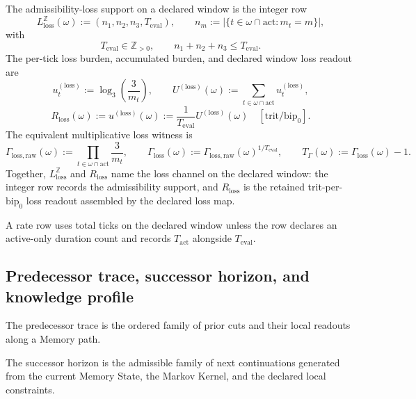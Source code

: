 \begin{definition}
\label{def:loss-channel}
The admissibility-loss support on a declared window is the integer row
\[
L_{\mathrm{loss}}^{\mathbb Z}(\omega):=(n_1,n_2,n_3,T_{\mathrm{eval}}),
\qquad
n_m:=|\{t\in\omega\cap\mathrm{act}:m_t=m\}|,
\]
with
\[
T_{\mathrm{eval}}\in\mathbb Z_{>0},
\qquad
n_1+n_2+n_3\le T_{\mathrm{eval}}.
\]
The per-tick loss burden, accumulated burden, and declared window loss readout are
\[
u_t^{(\mathrm{loss})}:=\log_3\!\left(\frac{3}{m_t}\right),
\qquad
U^{(\mathrm{loss})}(\omega):=\sum_{t\in\omega\cap\mathrm{act}}u_t^{(\mathrm{loss})},
\]
\[
R_{\mathrm{loss}}(\omega):=u^{(\mathrm{loss})}(\omega):=\frac{1}{T_{\mathrm{eval}}}U^{(\mathrm{loss})}(\omega)
\quad[\mathrm{trit}/\mathrm{bip}_0].
\]
The equivalent multiplicative loss witness is
\[
\Gamma_{\mathrm{loss,raw}}(\omega):=\prod_{t\in\omega\cap\mathrm{act}}\frac{3}{m_t},
\qquad
\Gamma_{\mathrm{loss}}(\omega):=\Gamma_{\mathrm{loss,raw}}(\omega)^{1/T_{\mathrm{eval}}},
\qquad
T_\Gamma(\omega):=\Gamma_{\mathrm{loss}}(\omega)-1.
\]
Together, \(L_{\mathrm{loss}}^{\mathbb Z}\) and \(R_{\mathrm{loss}}\) name the loss channel on the declared window: the integer row records the admissibility support, and \(R_{\mathrm{loss}}\) is the retained trit-per-\(\mathrm{bip}_0\) loss readout assembled by the declared loss map.
\end{definition}

\begin{definition}
\label{def:rate-duration-count}
A rate row uses total ticks on the declared window unless the row declares an active-only duration count and records $T_{\mathrm{act}}$ alongside $T_{\mathrm{eval}}$.
\end{definition}

\subsection{Predecessor trace, successor horizon, and knowledge profile}
\begin{definition}
\label{def:predecessor-trace}
The predecessor trace is the ordered family of prior cuts and their local readouts along a Memory path.
\end{definition}

\begin{definition}
\label{def:successor-horizon}
The successor horizon is the admissible family of next continuations generated from the current Memory State, the Markov Kernel, and the declared local constraints.
\end{definition}

